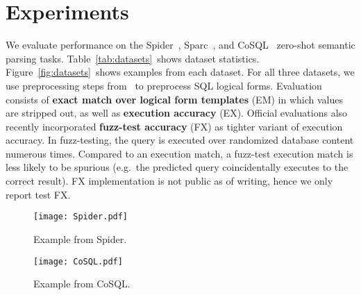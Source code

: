 \documentclass[11pt,a4paper]{article}
\begin{document}
\section{Experiments}
\label{sec:experiments}


We evaluate performance on the Spider~\citep{yu2018spider}, Sparc~\citep{yu2019sparc}, and CoSQL~\citep{yu2019cosql} zero-shot semantic parsing tasks.
Table~\ref{tab:datasets}~shows dataset statistics.
Figure~\ref{fig:datasets}~shows examples from each dataset.
For all three datasets, we use preprocessing steps from~\citet{zhang2019editing} to preprocess SQL logical forms.
Evaluation consists of \textbf{exact match over logical form templates} (EM) in which values are stripped out, as well as \textbf{execution accuracy} (EX).
Official evaluations also recently incorporated \textbf{fuzz-test accuracy} (FX) as tighter variant of execution accuracy.
In fuzz-testing, the query is executed over randomized database content numerous times.
Compared to an execution match, a fuzz-test execution match is less likely to be spurious (e.g.~the predicted query coincidentally executes to the correct result).
FX implementation is not public as of writing, hence we only report test FX.


\begin{figure*}[t]
\centering
\begin{subfigure}[b]{0.95\linewidth}
   \texttt{[image: Spider.pdf]}
   \caption{Example from Spider.}
   \label{fig:spider}
\end{subfigure}
\begin{subfigure}[b]{0.95\linewidth}
   \texttt{[image: CoSQL.pdf]}
   \caption{Example from CoSQL.}
   \label{fig:cosql}
\end{subfigure}
\vspace{-0.15in}
\caption{
Examples from (a) Spider and (b) CoSQL.
Context and output are respectively shown in purple and blue.
We do not show Sparc because its data format is similar to CoSQL, but without user dialogue act prediction and without response generation.
For our experiments, we produce the output logical form given the data, utterance, and the previous logical form if applicable.
During evaluation, the previous logical form is the output of the model during the previous turn (i.e. no teacher forcing on ground-truth previous output).
}
\vspace{-0.1in}
\label{fig:datasets}
\end{figure*}
\end{document}

